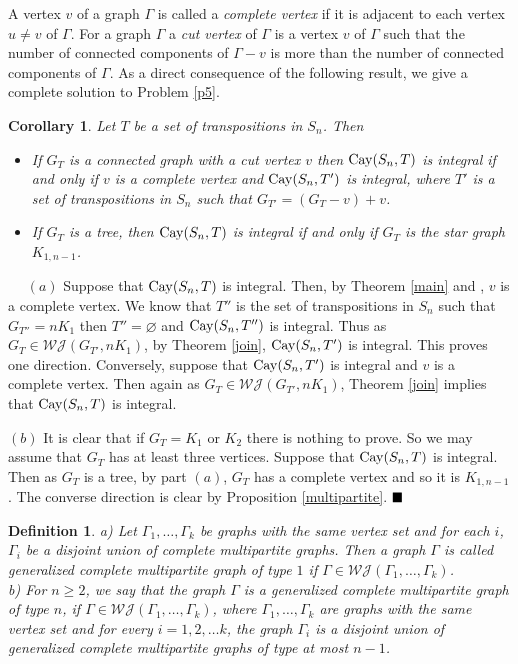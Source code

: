 \documentclass[12pt,a4paper]{article}
\newtheorem{corollary}{\bf Corollary}
\newtheorem{defin}{\bf Definition}
\renewcommand{\proof}{\noindent{\it\textbf{Proof.}}\ \ }
\newcommand{\Cay}{{\rm Cay}}
\newcommand{\eqd}{$\hfill \blacksquare$}
\begin{document}
A vertex $v$ of a graph $\Gamma$ is called a \textit{complete vertex} if it is adjacent to each vertex $u\neq v$ of $\Gamma$.
For a graph $\Gamma$ a \textit{cut vertex} of $\Gamma$ is a vertex $v$ of $\Gamma$ such that the number of connected components of $\Gamma-v$ is more than the number of connected components of $\Gamma$.
 As a direct consequence of the following result, we give a complete solution to Problem \ref{p5}.


\begin{corollary}\label{cut}
Let $T$ be a set of transpositions in $S_n$. Then 
\begin{itemize}
\item[(a)] If $G_T$ is a connected graph with a cut vertex $v$ then $\Cay(S_n,T)$ is integral if and only if $v$ is a complete vertex and $\Cay(S_{n},T')$ is integral, where $T'$ is a set of transpositions in $S_n$ such that $G_{T'}=(G_T-v)+v$.
\item[(b)] If $G_T$ is a tree, then $\Cay(S_n,T)$ is integral if and only if $G_T$ is the star graph $K_{1,n-1}$.
\end{itemize}
\end{corollary}
\proof 
$(a)$ Suppose that $\Cay(S_n,T)$ is integral. Then, by Theorem \ref{main} and \cite[Corollary 2.1]{K}, $v$ is a complete vertex.
We know that $T''$ is the set of transpositions in $S_n$ such that $G_{T''}=nK_1$ then $T''=\varnothing$ and $\Cay(S_n,T'')$ is integral.
Thus as $G_T\in\mathcal{WJ}(G_{T'},nK_1)$, by Theorem \ref{join}, $\Cay(S_{n},T')$ is integral. This proves one direction. Conversely, suppose that $\Cay(S_n,T')$ is integral and $v$ is a complete vertex. Then again as $G_T\in\mathcal{WJ}(G_{T'},nK_1)$, Theorem \ref{join} implies that $\Cay(S_n,T)$ is integral.

$(b)$ It is clear that if $G_T=K_1$ or $K_2$ there is nothing to prove. So we may assume that $G_T$ has at least three vertices. Suppose that $\Cay(S_n,T)$ is integral. Then as $G_T$ is a tree, by part $(a)$, $G_T$ has a complete vertex and so it is $K_{1,n-1}$. The converse direction is clear by Proposition \ref{multipartite}.
\eqd

\begin{defin} \label{def1} {\rm   a) Let $\Gamma_1,\dots,\Gamma_k$ be graphs with the same vertex set and for each $i$, $\Gamma_i$ be a disjoint union of complete multipartite graphs. Then a graph $\Gamma$ is called \textit{generalized complete multipartite graph of  type $1$} if $\Gamma\in\mathcal{WJ}(\Gamma_1,\dots,\Gamma_k)$.\\
b) For $n\geq 2$, we say that the graph $\Gamma$ is a \textit{generalized complete multipartite graph of  type $n$}, if $\Gamma\in\mathcal{WJ}(\Gamma_1,\dots,\Gamma_k)$, where $\Gamma_1,\dots,\Gamma_k$ are graphs with the same vertex set and for every $i=1,2,\dots k$, the graph $\Gamma_i$ is a disjoint union of generalized complete multipartite graphs of  type at most $n-1$.}
\end{defin}
\end{document}
